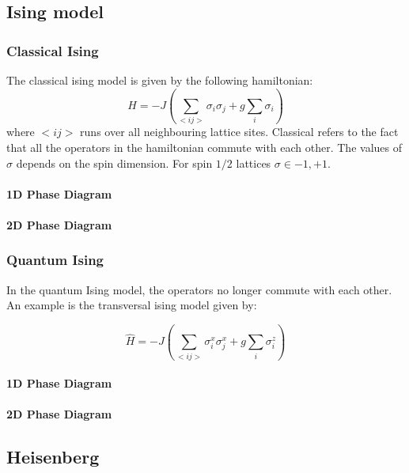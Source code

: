 \subsection{Ising model}

\subsubsection{Classical Ising}

The classical ising model is given by the following hamiltonian:
\begin{equation}
    H = -J \left (  \sum_{<i j>} \sigma_i \sigma_j + g\sum_i \sigma_i \right )
\end{equation}
where $<i j>$ runs over all neighbouring lattice sites. Classical refers to the fact that all the operators in the hamiltonian commute with each other. The values of $\sigma$ depends on the spin dimension. For spin $1/2$ lattices $\sigma \in {-1,+1}$.

\paragraph{1D Phase Diagram}

\paragraph{2D Phase Diagram}

\subsubsection{Quantum Ising}
In the quantum Ising model, the operators no longer commute with each other. An example is the transversal ising model given by:

\begin{equation}
    \hat{H} = -J \left (  \sum_{<i j>} \sigma^x_i \sigma^x_j + g \sum_i \sigma^z_i \right )
\end{equation}

\paragraph{1D Phase Diagram}

\paragraph{2D Phase Diagram}

\subsection{Heisenberg}

